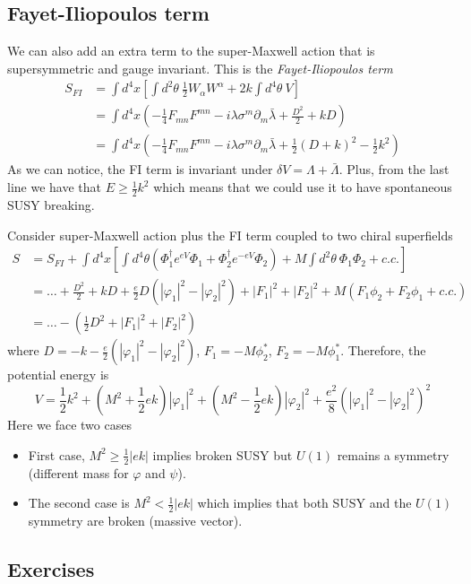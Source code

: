 \documentclass[a4paper,12pt]{article}
\numberwithin{equation}{section}
\numberwithin{exe}{section}
\newcommand{\p}{{\partial}}
\renewcommand{\a}{{\alpha}}
\renewcommand{\d}{{\delta}}
\renewcommand{\l}{{\lambda}}
\newcommand{\lb}{{\bar\lambda}}
\renewcommand{\L}{{\Lambda}}
\newcommand{\Lb}{{\bar\Lambda}}
\newcommand{\s}{{\sigma}}
\renewcommand{\t}{{\theta}}
\newcommand{\vphi}{{\varphi}}
\begin{document}
\subsection{Fayet-Iliopoulos term}
We can also add an extra term to the super-Maxwell action that is supersymmetric and gauge invariant. This is the {\it Fayet-Iliopoulos term}
	\begin{align}
	S_{FI} & = \int d^4x \left[ \int d^2\t\ \frac12 W_\a W^\a + 2k\int d^4\t\ V \right] \nonumber \\
	& = \int d^4x \left( -\frac14 F_{mn}F^{mn} - i\l\s^m\p_m \lb + \frac{D^2}{2} + kD \right) \nonumber \\
	& = \int d^4x \left( -\frac14 F_{mn}F^{mn} - i\l\s^m\p_m \lb + \frac12 (D+k)^2 - \frac12 k^2 \right)
	\end{align}
As we can notice, the FI term is invariant under $\d V = \L + \Lb$. Plus, from the last line we have that $E\geq \frac12 k^2$ which means that we could use it to have spontaneous SUSY breaking.

Consider super-Maxwell action plus the FI term coupled to two chiral superfields
	\begin{align}
	S & = S_{FI} + \int d^4x\left[ \int d^4\t(\Phi^\dagger_1 e^{eV}\Phi_1 + \Phi^\dagger_2 e^{-eV}\Phi_2) + M\int d^2\t\ \Phi_1\Phi_2 + c.c. \right] \nonumber \\
	& = \ldots + \frac{D^2}{2} + kD + \frac{e}{2} D(|\vphi_1|^2 - |\vphi_2|^2) + |F_1|^2 + |F_2|^2 + M(F_1 \phi_2 + F_2 \phi_1 + c.c.) \nonumber \\
	& = \dots - \left(\frac12 D^2 + |F_1|^2 + |F_2|^2\right)
	\end{align}
where $D= -k-\frac{e}{2}(|\vphi_1|^2 - |\vphi_2|^2)$, $F_1 = -M \phi_2^*$, $F_2 = -M \phi_1^*$. Therefore, the potential energy is
	\begin{equation}
	V = \frac12 k^2 + (M^2 + \frac12 ek)|\vphi_1|^2 + (M^2 - \frac12 ek)|\vphi_2|^2 + \frac{e^2}{8}(|\vphi_1|^2 - |\vphi_2|^2)^2
	\end{equation}
Here we face two cases
	\begin{itemize}
	\item First case, $M^2\geq \frac12 |ek|$ implies broken SUSY but $U(1)$ remains a symmetry (different mass for $\vphi$ and $\psi$).
	\item The second case is $M^2 < \frac12 |ek|$ which implies that both SUSY and the $U(1)$ symmetry are broken (massive vector).
	\end{itemize}

\subsection{Exercises}
\end{document}
